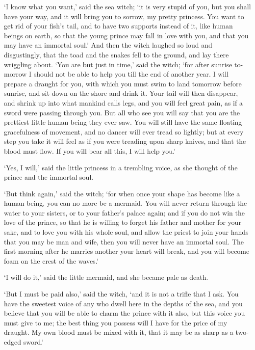 `I know what you want,' said the sea witch; `it is very stupid of you, but you shall have your way, and it will bring you to sorrow, my pretty princess.
You want to get rid of your fish’s tail, and to have two supports instead of it, like human beings on earth, so that the young prince may fall in love with you, and that you may have an immortal soul.' And then the witch laughed so loud and disgustingly, that the toad and the snakes fell to the ground, and lay there wriggling about.
`You are but just in time,' said the witch; `for after sunrise to-morrow I should not be able to help you till the end of another year.
I will prepare a draught for you, with which you must swim to land tomorrow before sunrise, and sit down on the shore and drink it.
Your tail will then disappear, and shrink up into what mankind calls legs, and you will feel great pain, as if a sword were passing through you.
But all who see you will say that you are the prettiest little human being they ever saw.
You will still have the same floating gracefulness of movement, and no dancer will ever tread so lightly; but at every step you take it will feel as if you were treading upon sharp knives, and that the blood must flow.
If you will bear all this, I will help you.'

`Yes, I will,' said the little princess in a trembling voice, as she thought of the prince and the immortal soul.

`But think again,' said the witch; `for when once your shape has become like a human being, you can no more be a mermaid.
You will never return through the water to your sisters, or to your father’s palace again; and if you do not win the love of the prince, so that he is willing to forget his father and mother for your sake, and to love you with his whole soul, and allow the priest to join your hands that you may be man and wife, then you will never have an immortal soul.
The first morning after he marries another your heart will break, and you will become foam on the crest of the waves.'

`I will do it,' said the little mermaid, and she became pale as death.

`But I must be paid also,' said the witch, `and it is not a trifle that I ask.
You have the sweetest voice of any who dwell here in the depths of the sea, and you believe that you will be able to charm the prince with it also, but this voice you must give to me; the best thing you possess will I have for the price of my draught.
My own blood must be mixed with it, that it may be as sharp as a two-edged sword.'


